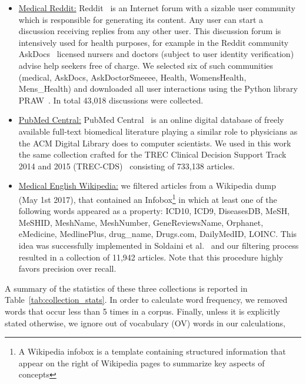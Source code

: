 \begin{itemize}
\item \underline{Medical Reddit:} Reddit~\cite{reddit} is an Internet forum with a sizable user community which is responsible for generating its content. Any user can start a discussion receiving replies from any other user. This discussion forum is intensively used for health purposes, for example in the Reddit community AskDocs~\cite{redditaskdocs} licensed nursers and doctors (subject to user identity verification) advise help seekers free of charge. We selected six of such communities
    (medical, AskDocs, AskDoctorSmeeee, Health, WomensHealth, Mens\_Health) and downloaded all user interactions using the Python library PRAW~\cite{redditapi}. In total 43,018 discussions were collected.

\item \underline{PubMed Central:} PubMed Central~\cite{pubmed} is an online digital database of freely available full-text biomedical literature playing a similar role to physicians as the ACM Digital Library does to computer scientists. We used in this work the same collection crafted for the TREC Clinical Decision Support Track 2014 and 2015 (TREC-CDS)~\cite{roberts16,trec15} consisting of 733,138 articles. 
 
\item \underline{Medical English Wikipedia:} we filtered articles from a Wikipedia dump~\cite{wikipedia} (May 1st 2017), that contained an Infobox\footnote{A Wikipedia infobox is a template containing structured information that appear on the right of Wikipedia pages to summarize key aspects of concepts} in which at least one of the following words appeared as a property: ICD10, ICD9, DiseasesDB, MeSH, MeSHID, MeshName, MeshNumber, GeneReviewsName, Orphanet, eMedicine, MedlinePlus, drug\_name, Drugs.com, DailyMedID, LOINC.
This idea was successfully implemented in Soldaini et al.~\cite{soldaini15} and our filtering process resulted in a collection of 11,942 articles. 
Note that this procedure highly favors precision over recall. %
\end{itemize}

A summary of the statistics of these three collections is reported in Table~\ref{tab:collection_stats}.
In order to calculate word frequency, we removed words that occur less than 5 times in a corpus.
Finally, unless it is explicitly stated otherwise, we ignore out of vocabulary (OV) words in our calculations,

